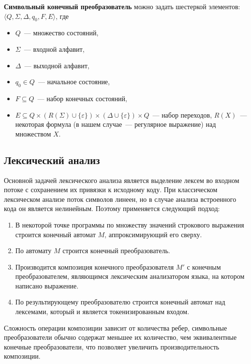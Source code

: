 \textbf{Символьный конечный преобразователь} можно задать шестеркой элементов: 
$\langle Q, \Sigma, \Delta, q_0, F, E \rangle$, где

\begin{itemize}
\item $Q$~--- множество состояний, 
\item $\Sigma$~--- входной алфавит, 
\item $\Delta$~--- выходной алфавит, 
\item $q_0 \in Q$~--- начальное состояние, 
\item $F \subseteq Q$~--- набор конечных состояний, 
\item $E \subseteq Q \times (R(\Sigma) \cup \{\varepsilon\}) \times (\Delta \cup \{\varepsilon\})  \times Q$~--- набор переходов, $R(X)$~--- некоторая формула (в нашем случае~--- регулярное выражение) над множеством $X$.
\end{itemize}

\subsection{Лексический анализ}
Основной задачей лексического анализа является выделение лексем во входном потоке с сохранением их привязки к исходному коду. При классическом лексическом анализе поток символов линеен, но в случае анализа встроенного кода он является нелинейным. Поэтому применяется следующий подход:

\begin{enumerate}
\item В некоторой точке программы по множеству значений строкового выражения строится конечный автомат $M$, аппроксимирующий его сверху.
\item По автомату $M$ строится конечный преобразователь.
\item Производится композиция конечного преобразователя $M'$ с конечным преобразователем, являющимся лексическим анализатором языка, на котором написано выражение.
\item По результирующему преобразователю строится конечный автомат над лексемами, который и является токенизированным входом.
\end{enumerate}

Сложность операции композиции зависит от количества ребер, символьные преобразователи обычно содержат меньшее их количество, чем эквивалентные конечные преобразователи, что позволяет увеличить производительность композиции.

